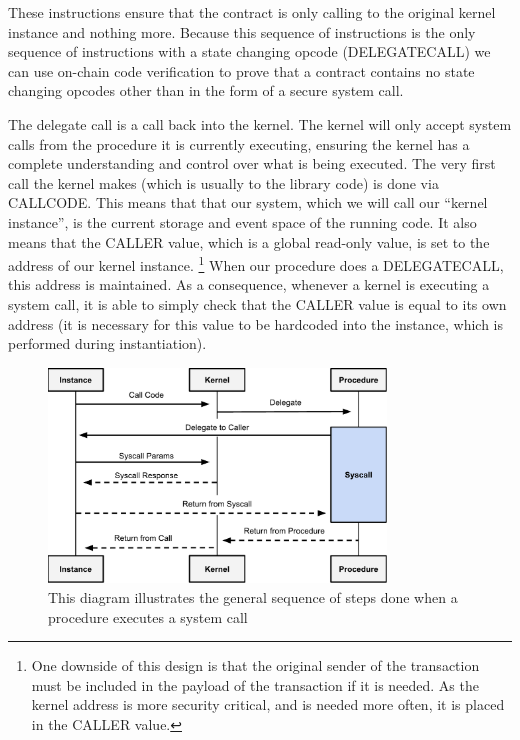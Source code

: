 \documentclass[english,a4paper]{article}
\begin{document}
These instructions ensure that the contract is only calling to the
original kernel instance and nothing more. Because this sequence of
instructions is the only sequence of instructions with a state changing
opcode (DELEGATECALL) we can use on-chain code verification to prove
that a contract contains no state changing opcodes other than in the
form of a secure system call.

The delegate call is a call back into the kernel. The kernel will only
accept system calls from the procedure it is currently executing, ensuring the
kernel has a complete understanding and control over what is being executed.
The very first call the kernel makes (which is usually to the library code) is
done
via CALLCODE. This means that that our system, which we will call our
``kernel instance'', is the current storage and event space of the
running code. It also means that the CALLER value,
which is a global
read-only value, is set to the address of our kernel instance.
\footnote{One downside of this design
is that the original sender of the transaction must be included in the payload
of the transaction if it is needed. As the kernel address is more security
critical, and is needed more often, it is placed in the CALLER value.} When our
procedure does a DELEGATECALL, this address is maintained. As a
consequence, whenever a kernel is executing a system call, it is able to
simply check that the CALLER value is equal to its own address (it is
necessary for this value to be hardcoded into the instance, which is
performed during instantiation).

\begin{figure}[htbp]
\centering
\includegraphics[width=0.8\textwidth]{media/SystemCalls.pdf}
\caption{This diagram illustrates the general sequence of steps
done when a procedure executes a system call}
\end{figure}
\end{document}
